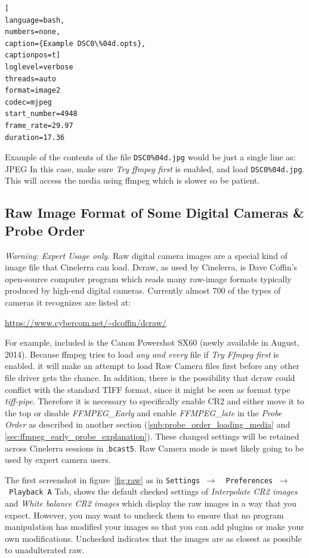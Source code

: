 \begin{lstlisting}[
language=bash,
numbers=none,
caption={Example DSC0\%04d.opts},
captionpos=t]
loglevel=verbose
threads=auto
format=image2
codec=mjpeg 
start_number=4948
frame_rate=29.97
duration=17.36
\end{lstlisting}

Example of the contents of the file \texttt{DSC0\%04d.jpg} would be just a single line as:  JPEG
In this case, make sure \textit{Try ffmpeg first} is enabled, and load \texttt{DSC0\%04d.jpg}.  
This will access the media using ffmpeg which is slower so be patient.

\subsection{Raw Image Format of Some Digital Cameras \& Probe Order}%
\label{sub:raw_image_format_digital_camera_probe_order}

\textit{Warning: Expert Usage only.}  Raw digital camera images are a special kind of image file that Cinelerra can load. Dcraw, as used by Cinelerra, is Dave Coffin’s open-source computer program which reads many raw-image formats typically produced by high-end digital cameras.  Currently almost 700 of the types of cameras it recognizes are listed at:

\hspace{4em}	{\small \url{https://www.cybercom.net/~dcoffin/dcraw/}}

For example, included is the Canon Powershot SX60 (newly available in August, 2014).  Because ffmpeg tries to load \textit{any and every} file if \textit{Try Ffmpeg first} is enabled. it will make an attempt to load Raw Camera files first before any other file driver gets the chance.  In addition, there is the possibility that dcraw could conflict with the standard TIFF format, since it might be seen as format type \textit{tiff-pipe}.  Therefore it is necessary to specifically enable CR2 and either move it to the top or disable \textit{FFMPEG\_Early} and enable \textit{FFMPEG\_late} in the \textit{Probe Order} as described in another section (\ref{sub:probe_order_loading_media} and \ref{sec:ffmpeg_early_probe_explanation}).  These changed settings will be retained across Cinelerra sessions in .\texttt{bcast5}.  Raw Camera mode is most likely going to be used by expert camera users.

The first screenshot in figure~\ref{fig:raw} as in \texttt{Settings $\rightarrow$ ~Preferences $\rightarrow$ ~Playback A} Tab, shows the default checked settings of \textit{Interpolate CR2 images} and \textit{White balance CR2 images} which display the raw images in a way that you expect.  However, you may want to uncheck them to ensure that no program manipulation has modified your images so that you can add plugins or make your own modifications.  Unchecked indicates that the images are as closest as possible to unadulterated raw.

